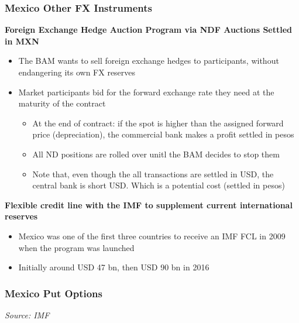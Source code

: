 \documentclass{beamer}
\newenvironment{wideitemize}{\itemize\addtolength{\itemsep}{10pt}}{\enditemize}
\begin{document}
\begin{frame}
  \frametitle{Mexico Other FX Instruments}
  \begin{wideitemize}
  \item \textbf{Foreign Exchange Hedge Auction Program via NDF Auctions Settled in MXN}
    \begin{itemize}
    \item The BAM wants to sell foreign exchange hedges to participants, without endangering its own FX reserves
    \item Market participants bid for the forward exchange rate they need at the maturity of the contract
      \begin{itemize}
      \item At the end of contract: if the spot is higher than the assigned forward price (depreciation), the commercial bank makes a profit settled in pesos
      \item All ND positions are rolled over unitl the BAM decides to stop them
      \item Note that, even though the all transactions are settled in USD, the central bank is short USD. Which is a potential cost (settled in pesos)
      \end{itemize}
    \end{itemize}
  \item \textbf{Flexible credit line with the IMF to supplement current international reserves}
    \begin{itemize}
    \item  Mexico was one of the first three countries to receive an IMF FCL in 2009 when the program was launched
    \item Initially around USD 47 bn, then USD 90 bn in 2016
    \end{itemize}
  \end{wideitemize}
\end{frame}


\begin{frame}
  \frametitle{Mexico Put Options}
  \medskip
  \emph{Source: IMF \href{https://www.elibrary.imf.org/display/book/9781484375686/ch010.xml}{}}
\end{frame}
\end{document}
